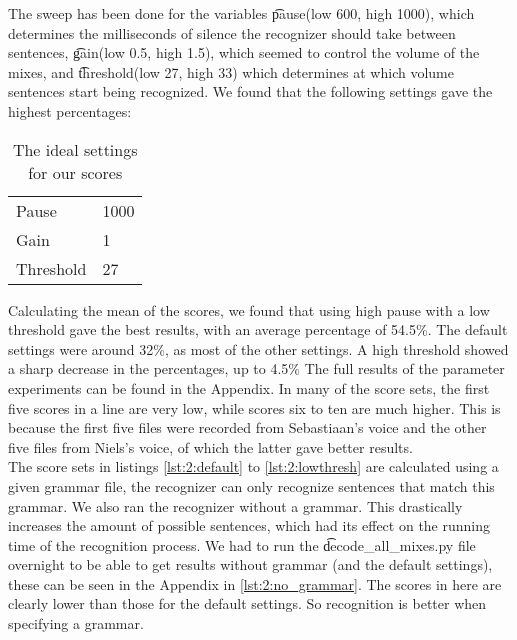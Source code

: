 
The sweep has been done for the variables \t{pause}(low 600, high 1000), which determines the milliseconds of silence the recognizer should take between sentences, \t{gain}(low 0.5, high 1.5), which seemed to control the volume of the mixes, and \t{threshold}(low 27, high 33) which determines at which volume sentences start being recognized. We found that the following settings gave the highest percentages:

\begin{table}[]
\centering
\caption{The ideal settings for our scores}
\label{my-label}
\begin{tabular}{l|l}
Pause     & 1000 \\
Gain      & 1    \\
Threshold & 27  
\end{tabular}
\end{table}

Calculating the mean of the scores, we found that using high pause with a low threshold gave the best results, with an average percentage of 54.5$\%$. The default settings were around 32$\%$, as most of the other settings. A high threshold showed a sharp decrease in the percentages, up to 4.5$\%$ The full results of the parameter experiments can be found in the Appendix. In many of the score sets, the first five scores in a line are very low, while scores six to ten are much higher. This is because the first five files were recorded from Sebastiaan's voice and the other five files from Niels's voice, of which the latter gave better results.\\
The score sets in listings \ref{lst:2:default} to \ref{lst:2:lowthresh} are calculated using a given grammar file, the recognizer can only recognize sentences that match this grammar. We also ran the recognizer without a grammar. This drastically increases the amount of possible sentences, which had its effect on the running time of the recognition process. We had to run the \t{decode_all_mixes.py} file overnight to be able to get results without grammar (and the default settings), these can be seen in the Appendix in \cref{lst:2:no_grammar}. The scores in here are clearly lower than those for the default settings. So recognition is better when specifying a grammar.

